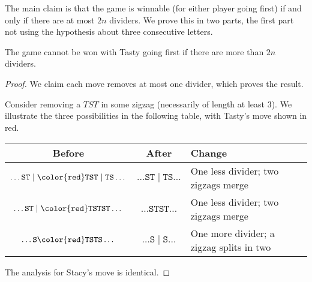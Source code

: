 \documentclass[11pt]{scrartcl}
\begin{document}
The main claim is that
the game is winnable (for either player going first)
if and only if there are at most $2n$ dividers.
We prove this in two parts,
the first part not using the hypothesis about three consecutive letters.

\begin{claim*}
  The game cannot be won with Tasty going first
  if there are more than $2n$ dividers.
\end{claim*}
\begin{proof}
  We claim each move removes at most one divider,
  which proves the result.

  Consider removing a $TST$ in some zigzag
  (necessarily of length at least $3$).
  We illustrate the three possibilities in the following table,
  with Tasty's move shown in red.
  \begin{center}
  \begin{tabular}{ccl}
    Before & After & Change \\ \hline
    $\dots \mathtt{ST} \mid \mathtt{\color{red} TST}
      \mid \mathtt{TS}\dots$
      & $\dots \mathtt{ST} \mid \mathtt{TS} \dots$
      & One less divider; two zigzags merge \\
    $\dots \mathtt{ST} \mid \mathtt{\color{red} TST}
      \mathtt{ST}\dots$
      & $\dots \mathtt{STST} \dots$
      & One less divider; two zigzags merge \\
    $\dots \mathtt{S} \mathtt{\color{red} TST} \mathtt{S} \dots$
      & $\dots \mathtt{S} \mid \mathtt{S} \dots$
      & One more divider; a zigzag splits in two
  \end{tabular}
  \end{center}
  The analysis for Stacy's move is identical.
\end{proof}
\end{document}
